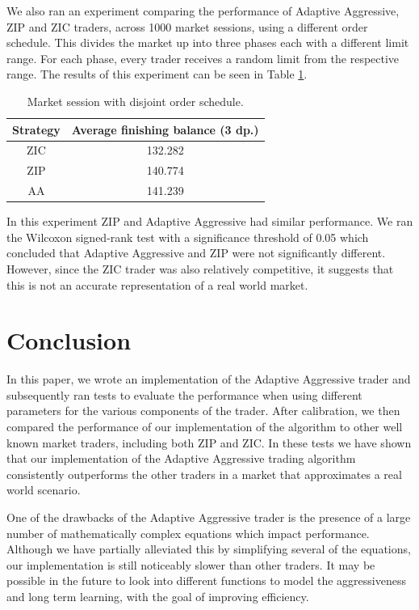\documentclass[preprint]{acm_proc_article-sp} %
\begin{document}
We also ran an experiment comparing the performance of Adaptive Aggressive, ZIP
and ZIC traders, across 1000 market sessions, using a different order schedule.
This divides the
market up into three phases each with a  different limit range. For each phase,
every trader receives a random limit from the respective range. The results of this
experiment can be seen in Table \ref{tbl:disjoint_market}.
\begin{table}[H]
  \centering
  \begin{tabular}{ | c | c | }
    \hline
    Strategy & Average finishing balance (3 dp.) \\
    \hline
    ZIC & 132.282 \\
    ZIP & 140.774 \\
    AA & 141.239 \\
    \hline
  \end{tabular}
  \caption{Market session with disjoint order schedule.}
  \label{tbl:disjoint_market}
\end{table}
In this experiment ZIP and Adaptive Aggressive had similar performance. We ran the
Wilcoxon signed-rank test with a significance threshold of 0.05 which concluded
that Adaptive Aggressive and ZIP were not significantly different. However,
since the ZIC trader was also relatively competitive, it suggests that this is
not an accurate representation of a real world market.\\


\section{Conclusion} \label{sec:conclusion}
In this paper, we wrote an implementation of the Adaptive Aggressive trader and
subsequently ran tests to evaluate the performance when using different
parameters for the various components of the trader. After calibration, we then
compared the performance of our implementation of the algorithm  to other well
known market traders, including both ZIP and ZIC. In these tests we have shown
that our implementation of the  Adaptive Aggressive trading algorithm
consistently outperforms the other traders in a market that approximates a  real world scenario.

One of the drawbacks of the Adaptive Aggressive trader is the presence of a large number of
mathematically complex equations which impact performance. Although we have partially
alleviated this by simplifying several of the equations, our implementation is still
noticeably slower than other traders. It may be possible in the future to look
into different functions to model the aggressiveness and long term learning,
with the goal of improving efficiency.



\end{document}
